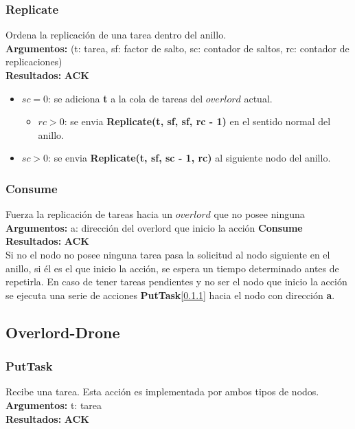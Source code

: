 \documentclass[a4paper,10pt]{article}
\begin{document}
		\subsubsection{Replicate}\label{rep}
			Ordena la replicación de una tarea dentro del anillo.
			\\
			\textbf{Argumentos:} (t: tarea, sf: factor de salto, sc: contador de saltos, rc: contador de replicaciones)\\
			\textbf{Resultados:} \textbf{ACK}\\
			
			\begin{itemize}
				\item $sc = 0$: se adiciona \textbf{t} a la cola de tareas del $overlord$ actual.
					\begin{itemize}
						\item $rc > 0$: se envia \textbf{Replicate(t, sf, sf, rc - 1)} en el sentido normal del anillo.
					\end{itemize}
				\item $sc > 0$: se envia \textbf{Replicate(t, sf, sc - 1, rc)} al siguiente nodo del anillo.			
			\end{itemize}
			
		\subsubsection{Consume}\label{cons}
			Fuerza la replicación de tareas hacia un $overlord$ que no posee ninguna
			\\
			\textbf{Argumentos:} a: dirección del overlord que inicio la acción \textbf{Consume}\\
			\textbf{Resultados:} \textbf{ACK}\\
			
			Si no el nodo no posee ninguna tarea pasa la solicitud al nodo siguiente en el anillo, si él es el que inicio la acción, se espera un tiempo determinado antes de repetirla. En caso de tener tareas pendientes y no ser el nodo que inicio la acción se ejecuta una serie de acciones \textbf{PutTask}[\ref{ptask}] hacia el nodo con dirección \textbf{a}.
			
	\pagebreak	
	\subsection{Overlord-Drone}
		\subsubsection{PutTask}\label{ptask}
			Recibe una tarea. Esta acción es implementada por ambos tipos de nodos.
			\\
			\textbf{Argumentos:} t: tarea\\
			\textbf{Resultados:} \textbf{ACK}\\
			
\end{document}
